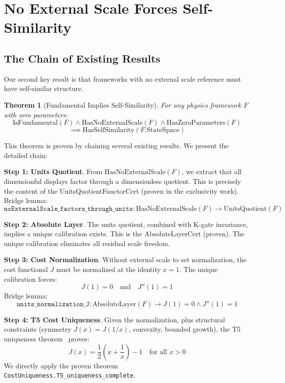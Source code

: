 \documentclass[12pt]{article}
\newtheorem{theorem}{Theorem}[section]
\theoremstyle{remark}
\begin{document}
\section{No External Scale Forces Self-Similarity}

\subsection{The Chain of Existing Results}

Our second key result is that frameworks with no external scale reference must have self-similar structure.

\begin{theorem}[Fundamental Implies Self-Similarity]\label{thm:fundamental-to-self-similar}
For any physics framework $F$ with zero parameters:
\[
\mathrm{IsFundamental}(F) \land \mathrm{HasNoExternalScale}(F) \land \mathrm{HasZeroParameters}(F)
\]
\[
\implies \mathrm{HasSelfSimilarity}(F.\mathrm{StateSpace})
\]
\end{theorem}

This theorem is proven by chaining several existing results. We present the detailed chain:

\textbf{Step 1: Units Quotient}. From $\mathrm{HasNoExternalScale}(F)$, we extract that all dimensionful displays factor through a dimensionless quotient. This is precisely the content of the UnitsQuotientFunctorCert (proven in the exclusivity work). Bridge lemma:
\[
\texttt{noExternalScale\_factors\_through\_units}: \mathrm{HasNoExternalScale}(F) \to \mathrm{UnitsQuotient}(F)
\]

\textbf{Step 2: Absolute Layer}. The units quotient, combined with K-gate invariance, implies a unique calibration exists. This is the AbsoluteLayerCert (proven). The unique calibration eliminates all residual scale freedom.

\textbf{Step 3: Cost Normalization}. Without external scale to set normalization, the cost functional $J$ must be normalized at the identity $x=1$. The unique calibration forces:
\[
J(1) = 0 \quad\text{and}\quad J''(1) = 1
\]
Bridge lemma:
\[
\texttt{units\_normalization\_J}: \mathrm{AbsoluteLayer}(F) \to J(1)=0 \land J''(1)=1
\]

\textbf{Step 4: T5 Cost Uniqueness}. Given the normalization, plus structural constraints (symmetry $J(x)=J(1/x)$, convexity, bounded growth), the T5 uniqueness theorem~\cite{Washburn2025Exclusivity} proves:
\[
J(x) = \frac{1}{2}\left(x + \frac{1}{x}\right) - 1 \quad \text{for all } x > 0
\]
We directly apply the proven theorem \texttt{CostUniqueness.T5\_uniqueness\_complete}.
\end{document}
